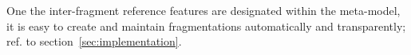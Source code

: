 One the inter-fragment reference features are designated within the meta-model, it is easy to create and maintain fragmentations automatically and transparently; ref. to section~\ref{sec:implementation}.

%
%
%
%
%
